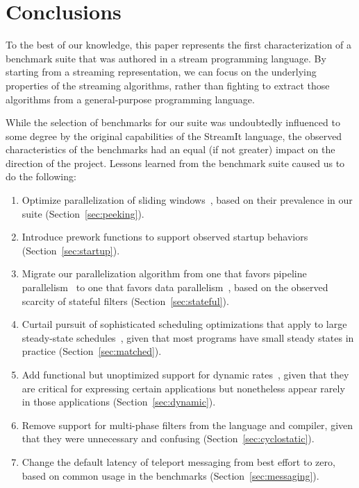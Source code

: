 \section{Conclusions}

To the best of our knowledge, this paper represents the first
characterization of a benchmark suite that was authored in a stream
programming language.  By starting from a streaming representation, we
can focus on the underlying properties of the streaming algorithms,
rather than fighting to extract those algorithms from a
general-purpose programming language.

While the selection of benchmarks for our suite was undoubtedly
influenced to some degree by the original capabilities of the StreamIt
language, the observed characteristics of the benchmarks had an equal
(if not greater) impact on the direction of the project.  Lessons
learned from the benchmark suite caused us to do the following:
\begin{enumerate}

\item Optimize parallelization of sliding windows~\cite{thies-thesis},
  based on their prevalence in our suite (Section~\ref{sec:peeking}).

\item Introduce prework functions to support observed startup
  behaviors (Section~\ref{sec:startup}).

\item Migrate our parallelization algorithm from one that favors
  pipeline parallelism~\cite{gordon-asplos02} to one that favors data
  parallelism~\cite{gordon-asplos06}, based on the observed scarcity
  of stateful filters (Section~\ref{sec:stateful}).

\item Curtail pursuit of sophisticated scheduling optimizations that
  apply to large steady-state schedules~\cite{karczmarek-lctes03},
  given that most programs have small steady states in practice
  (Section~\ref{sec:matched}).

\item Add functional but unoptimized support for dynamic
  rates~\cite{chen-graphics05}, given that they are critical for
  expressing certain applications but nonetheless appear rarely in
  those applications (Section~\ref{sec:dynamic}).

\item Remove support for multi-phase filters from the language and
  compiler, given that they were unnecessary and confusing
  (Section~\ref{sec:cyclostatic}).

\item Change the default latency of teleport messaging from best
  effort to zero, based on common usage in the benchmarks
  (Section~\ref{sec:messaging}).

\end{enumerate}

